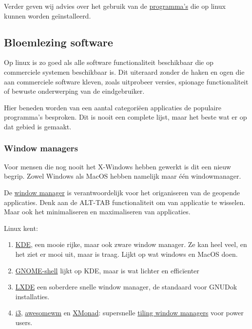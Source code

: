 Verder geven wij advies over het gebruik van de \href{https://packages.debian.org/stable/}{programma's} die op linux kunnen worden ge\"{i}nstalleerd.

\subsection{Bloemlezing software}
Op linux is zo goed als alle software functionaliteit beschikbaar die op commerciele systemen beschikbaar is. Dit uiteraard zonder de haken en ogen die aan commerciele software kleven, zoals uitprobeer versies, spionage functionaliteit of bewuste onderwerping van de eindgebruiker. 

Hier beneden worden van een aantal categori\"{e}en applicaties de populaire programma's besproken. Dit is nooit een complete lijst, maar het beste wat er op dat gebied is gemaakt.

\subsubsection{Window managers}
Voor mensen die nog nooit het X-Windows hebben gewerkt is dit een nieuw begrip. Zowel Windows als MacOS hebben namelijk maar \'{e}\'{e}n windowmanager. 

De \href{https://en.wikipedia.org/wiki/Window_manager}{window manager} is verantwoordelijk voor het origaniseren van de geopende applicaties. Denk aan de \textsc{ALT-TAB} functionaliteit om van applicatie te wisselen. Maar ook het minimaliseren en maximaliseren van applicaties.

Linux kent:

\begin{enumerate}
	\item \href{https://www.kde.org/}{KDE}, een mooie rijke, maar ook zware window manager. Ze kan heel veel, en het ziet er mooi uit, maar is traag. Lijkt op wat windows en MacOS doen.
	\item \href{http://www.gnome.org/}{GNOME-shell} lijkt op KDE, maar is wat lichter en effic\"{i}enter
	\item \href{http://lxde.org/}{LXDE} een soberdere snelle window manager, de standaard voor GNUDok installaties.
	\item \href{http://i3wm.org/}{i3}, \href{http://awesome.naquadah.org/}{awesomewm} en \href{http://xmonad.org/}{XMonad}: supersnelle \href{https://en.wikipedia.org/wiki/Tiling_window_manager}{tiling window managers} voor power users.
\end{enumerate}

